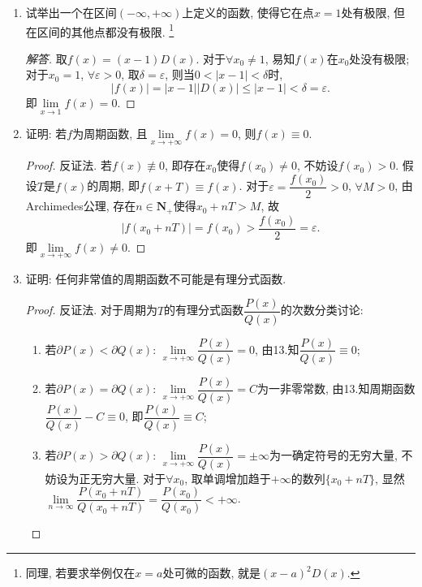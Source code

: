 \documentclass[a4paper,11pt,twoside]{ctexbook}
\begin{document}
\begin{enumerate}
	      \begin{proof}[方法三]
		      $\forall x_0\in(-\infty,+\infty)$, 由于有理数集$\mathbf{Q}$和无理数集$\mathbf{Q}^{C}$均在$\mathbf{R}$中稠密, 取有理数列$\{\xi_n\}$和无理数列$\{\eta\}$使得$\lim\limits_{n\to\infty} \xi_n=\lim\limits_{n\to\infty} \eta_n=x_0$. 但$\lim\limits_{n\to\infty} D(\xi_n)=1\neq 0=\lim\limits_{n\to\infty} \eta_n$. 由Heine定理知$D(x)$在$\forall x_0\in(-\infty,+\infty)$都没有极限. \qedhere
	      \end{proof}

	\item 试举出一个在区间$(-\infty,+\infty)$上定义的函数, 使得它在点$x=1$处有极限, 但在区间的其他点都没有极限. \footnote{同理, 若要求举例仅在$x=a$处可微的函数, 就是$(x-a)^2D(x)$.}
	      \begin{proof}[解答]
		      取$f(x)=(x-1)D(x)$. 对于$\forall x_0\neq 1$, 易知$f(x)$在$x_0$处没有极限; 对于$x_0=1$, $\forall\varepsilon>0$, 取$\delta=\varepsilon$, 则当$0<|x-1|<\delta$时,
		      \[
			      |f(x)|=|x-1||D(x)|\leqslant |x-1|<\delta=\varepsilon.
		      \]
		      即$\lim\limits_{x\to 1} f(x)=0$. \qedhere
	      \end{proof}

	\item 证明: 若$f$为周期函数, 且$\lim\limits_{x\to+\infty} f(x)=0$, 则$f(x)\equiv 0$.
	      \begin{proof}
		      反证法. 若$f(x)\not\equiv 0$, 即存在$x_0$使得$f(x_0)\neq 0$, 不妨设$f(x_0)>0$. 假设$T$是$f(x)$的周期, 即$f(x+T)\equiv f(x)$. 对于$\varepsilon=\dfrac{f(x_0)}{2}>0$, $\forall M>0$, 由Archimedes公理, 存在$n\in\mathbf{N}_{+}$使得$x_0+nT>M$, 故
		      \[
			      |f(x_0+nT)|=f(x_0)>\dfrac{f(x_0)}{2}=\varepsilon.
		      \]
		      即$\lim\limits_{x\to+\infty} f(x)\neq 0$. \qedhere
	      \end{proof}

	\item 证明: 任何非常值的周期函数不可能是有理分式函数.
	      \begin{proof}
		      反证法. 对于周期为$T$的有理分式函数$\dfrac{P(x)}{Q(x)}$的次数分类讨论:
		      \begin{enumerate}[(1)]
			      \item 若$\partial P(x)<\partial Q(x)$: $\lim\limits_{x\to+\infty} \dfrac{P(x)}{Q(x)}=0$, 由13.知$\dfrac{P(x)}{Q(x)}\equiv 0$;
			      \item 若$\partial P(x)=\partial Q(x)$: $\lim\limits_{x\to+\infty} \dfrac{P(x)}{Q(x)}=C$为一非零常数, 由13.知周期函数$\dfrac{P(x)}{Q(x)}-C\equiv 0$, 即$\dfrac{P(x)}{Q(x)}\equiv C$;
			      \item 若$\partial P(x)>\partial Q(x)$: $\lim\limits_{x\to+\infty} \dfrac{P(x)}{Q(x)}=\pm\infty$为一确定符号的无穷大量, 不妨设为正无穷大量. 对于$\forall x_0$, 取单调增加趋于$+\infty$的数列$\{x_0+nT\}$, 显然$\lim\limits_{n\to\infty} \dfrac{P(x_0+nT)}{Q(x_0+nT)}=\dfrac{P(x_0)}{Q(x_0)}<+\infty$. \qedhere
		      \end{enumerate}
	      \end{proof}
\end{enumerate}
\end{document}
